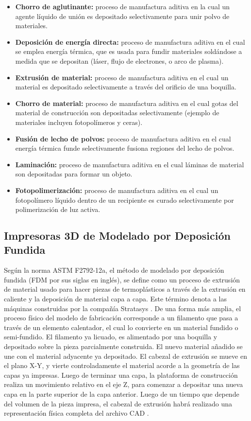 \begin{itemize}
\item \textbf{Chorro de aglutinante:} proceso de manufactura aditiva en la cual un agente líquido de unión es depositado selectivamente para unir polvo de materiales.
\item \textbf{Deposición de energía directa:} proceso de manufactura aditiva en el cual se emplea energía térmica, que es usada para fundir materiales soldándose a medida que se depositan (láser, flujo de electrones, o arco de plasma).
\item \textbf{Extrusión de material:} proceso de manufactura aditiva en el cual un material es depositado selectivamente a través del orificio de una boquilla.
\item \textbf{Chorro de material:} proceso de manufactura aditiva en el cual gotas del material de construcción son depositadas selectivamente (ejemplo de materiales incluyen fotopolímeros y ceras).
\item \textbf{Fusión de lecho de polvos:} proceso de manufactura aditiva en el cual energía térmica funde selectivamente fusiona regiones del lecho de polvos.
\item \textbf{Laminación:} proceso de manufactura aditiva en el cual láminas de material son depositadas para formar un objeto.
\item \textbf{Fotopolimerización:} proceso de manufactura aditiva en el cual un fotopolímero líquido dentro de un recipiente es curado selectivamente por polimerización de luz activa.
\end{itemize}


\subsection{Impresoras 3D de Modelado por Deposición Fundida}

Según la norma ASTM F2792-12a, el método de modelado por deposición fundida (FDM por sus siglas en inglés), se define como un proceso de extrusión de material usado para hacer piezas de termoplásticos a través de la extrusión en caliente y la deposición de material capa a capa. Este término denota a las máquinas construidas por la compañía Stratasys \parencite{astm2013}. De una forma más amplia, el proceso físico del modelo de fabricación corresponde a un filamento que pasa a través de un elemento calentador, el cual lo convierte en un material fundido o semi-fundido. El filamento ya licuado, es alimentado por una boquilla y depositado sobre la pieza parcialmente construida. El nuevo material añadido se une con el material adyacente ya depositado. El cabezal de extrusión se mueve en el plano X-Y, y vierte controladamente el material acorde a la geometría de las capas ya impresas. Luego de terminar una capa, la plataforma de construcción realiza un movimiento relativo en el eje Z, para comenzar a depositar una nueva capa en la parte superior de la capa anterior. Luego de un tiempo que depende del volumen de la pieza impresa, el cabezal de extrusión habrá realizado una representación física completa del archivo CAD \parencite{pdudek2013}.

